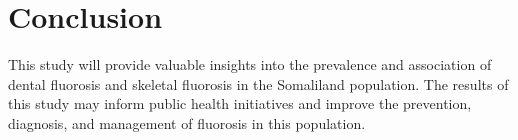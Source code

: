 \documentclass{article}
\begin{document}
\section{Conclusion}
This study will provide valuable insights into the prevalence and association of dental fluorosis and skeletal fluorosis in the Somaliland population. 
The results of this study may inform public health initiatives and improve the prevention, diagnosis, and management of fluorosis in this population.





\end{document}
